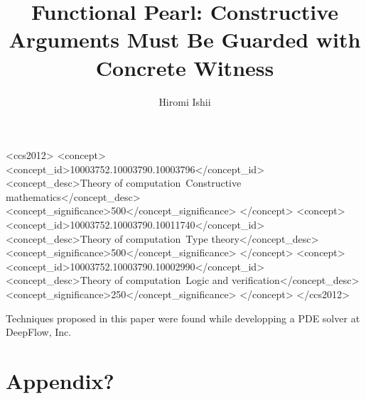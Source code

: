\documentclass[acmsmall]{acmart}
\begin{document}
\title[Constructive Arguments]{Functional Pearl: Constructive Arguments Must Be Guarded with Concrete Witness}
\author{Hiromi Ishii}

\renewcommand{\shortauthors}{Hiromi Ishii}

\begin{abstract}
  
\end{abstract}

\begin{CCSXML}
<ccs2012>
   <concept>
       <concept_id>10003752.10003790.10003796</concept_id>
       <concept_desc>Theory of computation~Constructive mathematics</concept_desc>
       <concept_significance>500</concept_significance>
       </concept>
   <concept>
       <concept_id>10003752.10003790.10011740</concept_id>
       <concept_desc>Theory of computation~Type theory</concept_desc>
       <concept_significance>500</concept_significance>
       </concept>
   <concept>
       <concept_id>10003752.10003790.10002990</concept_id>
       <concept_desc>Theory of computation~Logic and verification</concept_desc>
       <concept_significance>250</concept_significance>
       </concept>
 </ccs2012>
\end{CCSXML}




\maketitle





\begin{acks}
Techniques proposed in this paper were found while developping a PDE solver at DeepFlow, Inc.
\end{acks}




\appendix

\section{Appendix?}
\end{document}
